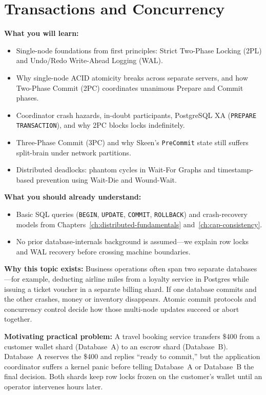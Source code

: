 \chapter{Transactions and Concurrency}
\label{ch:transactions-concurrency}

\begin{chaptergoalsbox}
\textbf{What you will learn:}
\begin{itemize}[leftmargin=12pt]
  \item Single-node foundations from first principles: Strict Two-Phase Locking (2PL) and Undo/Redo Write-Ahead Logging (WAL).
  \item Why single-node ACID atomicity breaks across separate servers, and how Two-Phase Commit (2PC) coordinates unanimous Prepare and Commit phases.
  \item Coordinator crash hazards, in-doubt participants, PostgreSQL XA (\texttt{PREPARE TRANSACTION}), and why 2PC blocks locks indefinitely.
  \item Three-Phase Commit (3PC) and why Skeen's \texttt{PreCommit} state still suffers split-brain under network partitions.
  \item Distributed deadlocks: phantom cycles in Wait-For Graphs and timestamp-based prevention using Wait-Die and Wound-Wait.
\end{itemize}

\textbf{What you should already understand:}
\begin{itemize}[leftmargin=12pt]
  \item Basic SQL queries (\texttt{BEGIN}, \texttt{UPDATE}, \texttt{COMMIT}, \texttt{ROLLBACK}) and crash-recovery models from Chapters~\ref{ch:distributed-fundamentals} and~\ref{ch:cap-consistency}.
  \item No prior database-internals background is assumed---we explain row locks and WAL recovery before crossing machine boundaries.
\end{itemize}

\textbf{Why this topic exists:}
Business operations often span two separate databases---for example, deducting airline miles from a loyalty service in Postgres while issuing a ticket voucher in a separate billing shard. If one database commits and the other crashes, money or inventory disappears. Atomic commit protocols and concurrency control decide how those multi-node updates succeed or abort together.

\textbf{Motivating practical problem:}
A travel booking service transfers \$400 from a customer wallet shard (Database~A) to an escrow shard (Database~B). Database~A reserves the \$400 and replies ``ready to commit,'' but the application coordinator suffers a kernel panic before telling Database~A or Database~B the final decision. Both shards keep row locks frozen on the customer's wallet until an operator intervenes hours later.
\end{chaptergoalsbox}

